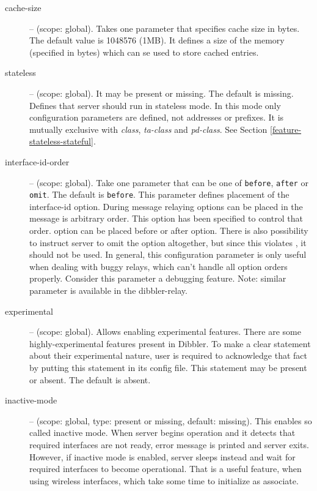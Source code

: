 \begin{description}
 \item[cache-size] -- (scope: global). Takes one parameter that
  specifies cache size in bytes. The default value is 1048576
  (1MB). It defines a size of the memory (specified in bytes) which
  can se used to store cached entries.

\item[stateless] -- (scope: global). It may be present or missing. The
  default is missing. Defines that server should run in stateless
  mode. In this mode only configuration parameters are defined, not
  addresses or prefixes. It is mutually exclusive
  with \emph{class}, \emph{ta-class} and \emph{pd-class}. See
  Section \ref{feature-stateless-stateful}.


\item[interface-id-order] -- (scope: global). Take one parameter that
  can be one of \verb+before+, \verb+after+ or \verb+omit+. The
        default is \verb+before+. This parameter defines placement of
        the interface-id option. During message relaying options can
        be placed in the  message is arbitrary
        order. This option has been specified to control that
        order.  option can be placed before or
        after  option. There is also possibility to
        instruct server to omit the  option
        altogether, but since this violates \cite{rfc3315}, it should
        not be used. In general, this configuration parameter is only
        useful when dealing with buggy relays, which can't handle all
        option orders properly. Consider this parameter a debugging
        feature. Note: similar parameter is available in the
        dibbler-relay.

\item[experimental] -- (scope: global). Allows enabling experimental
features. There are some highly-experimental features present in
Dibbler. To make a clear statement about their experimental nature,
user is required to acknowledge that fact by putting this statement in
its config file. This statement may be present or absent. The default
is absent.

\item[inactive-mode] -- (scope: global, type: present or missing,
  default: missing). This enables so called inactive mode. When server
  begins operation and it detects that required interfaces are not
  ready, error message is printed and server exits. However, if
  inactive mode is enabled, server sleeps instead and wait for
  required interfaces to become operational. That is a useful feature,
  when using wireless interfaces, which take some time to initialize
  as associate.


\end{description}
